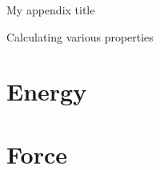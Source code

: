 \begin{chapter}{
\label{app:App1}My appendix title}
\end{chapter}
\begin{chapter}{
\label{app:App2}Calculating various properties}
\section{\label{appsection:energy} Energy}
\section{\label{appsection:force} Force}
\end{chapter}